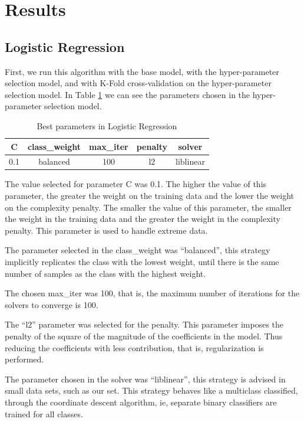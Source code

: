 \documentclass[conference]{IEEEtran}
\begin{document}
\section{Results}

\subsection{Logistic Regression}

First, we run this algorithm with the base model, with the hyper-parameter selection model, and with K-Fold cross-validation on the hyper-parameter selection model. In Table \ref{tab:tab1} we can see the parameters chosen in the hyper-parameter selection model.

\begin{table}[ht]
    \centering
    \caption{Best parameters in Logistic Regression} 
    \begin{tabular}{||c c c c c||} 
     \hline
     C & class\_weight & max\_iter & penalty & solver \\ [0.5ex] 
     \hline\hline
     0.1 & balanced & 100 & l2 & liblinear \\ 
    \hline
    \end{tabular}
    \label{tab:tab1}
\end{table}

The value selected for parameter C was 0.1. The higher the value of this parameter, the greater the weight on the training data and the lower the weight on the complexity penalty. The smaller the value of this parameter, the smaller the weight in the training data and the greater the weight in the complexity penalty. This parameter is used to handle extreme data. 

The parameter selected in the class\_weight was “balanced”, this strategy implicitly replicates the class with the lowest weight, until there is the same number of samples as the class with the highest weight.

The chosen max\_iter was 100, that is, the maximum number of iterations for the solvers to converge is 100.

The “l2” parameter was selected for the penalty. This parameter imposes the penalty of the square of the magnitude of the coefficients in the model. Thus reducing the coefficients with less contribution, that is, regularization is performed.

The parameter chosen in the solver was “liblinear”, this strategy is advised in small data sets, such as our set. This strategy behaves like a multiclass classified, through the coordinate descent algorithm, ie, separate binary classifiers are trained for all classes.
\end{document}
